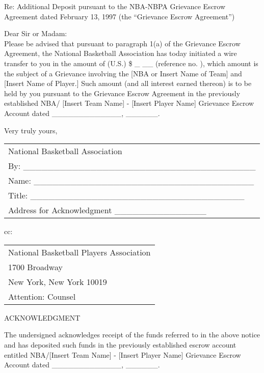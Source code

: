 \documentclass[
]{book}
\begin{document}
Re: Additional Deposit pursuant to the NBA-NBPA Grievance Escrow Agreement dated February 13, 1997 (the ``Grievance Escrow Agreement'')

Dear Sir or Madam:\\
Please be advised that pursuant to paragraph 1(a) of the Grievance Escrow Agreement, the National Basketball Association has today initiated a wire transfer to you in the amount of (U.S.) \$ \_ \_\_ (reference no. ), which amount is the subject of a Grievance involving the {[}NBA or Insert Name of Team{]} and {[}Insert Name of Player.{]} Such amount (and all interest earned thereon) is to be held by you pursuant to the Grievance Escrow Agreement in the previously established NBA/ {[}Insert Team Name{]} - {[}Insert Player Name{]} Grievance Escrow Account dated \_\_\_\_\_\_\_\_\_\_\_\_\_, \_\_\_\_\_\_.

Very truly yours,

\begin{longtable}[]{@{}l@{}}
\toprule()
\endhead
National Basketball Association \\
By: \_\_\_\_\_\_\_\_\_\_\_\_\_\_\_\_\_\_\_\_\_\_\_\_\_\_\_\_\_\_\_\_\_\_\_\_\_\_ \\
Name: \_\_\_\_\_\_\_\_\_\_\_\_\_\_\_\_\_\_\_\_\_\_\_\_\_\_\_\_\_\_\_\_\_\_\_\_ \\
Title: \_\_\_\_\_\_\_\_\_\_\_\_\_\_\_\_\_\_\_\_\_\_\_\_\_\_\_\_\_\_\_\_\_\_\_ \\
Address for Acknowledgment \_\_\_\_\_\_\_\_\_\_\_\_\_\_\_ \\
\bottomrule()
\end{longtable}

cc:

\begin{longtable}[]{@{}l@{}}
\toprule()
\endhead
National Basketball Players Association \\
1700 Broadway \\
New York, New York 10019 \\
Attention: Counsel \\
\bottomrule()
\end{longtable}

\newpage

ACKNOWLEDGMENT

The undersigned acknowledges receipt of the funds referred to in the above notice and has deposited such funds in the previously established escrow account entitled NBA/{[}Insert Team Name{]} - {[}Insert Player Name{]} Grievance Escrow Account dated \_\_\_\_\_\_\_\_\_\_\_\_\_, \_\_\_\_\_\_.
\end{document}
